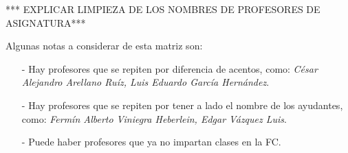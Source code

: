 *** EXPLICAR LIMPIEZA DE LOS NOMBRES DE PROFESORES DE ASIGNATURA***









Algunas notas a considerar de esta matriz son:
  
  \begin{itemize}
\item[-] Hay profesores que se repiten por diferencia de acentos, como: \textit{César Alejandro Arellano Ruíz, Luis Eduardo García Hernández}.

\item[-] Hay profesores que se repiten por tener a lado el nombre de los ayudantes, como: \textit{Fermín Alberto Viniegra Heberlein, Edgar Vázquez Luis}.

\item[-] Puede haber profesores que ya no impartan clases en la FC.
\end{itemize}
